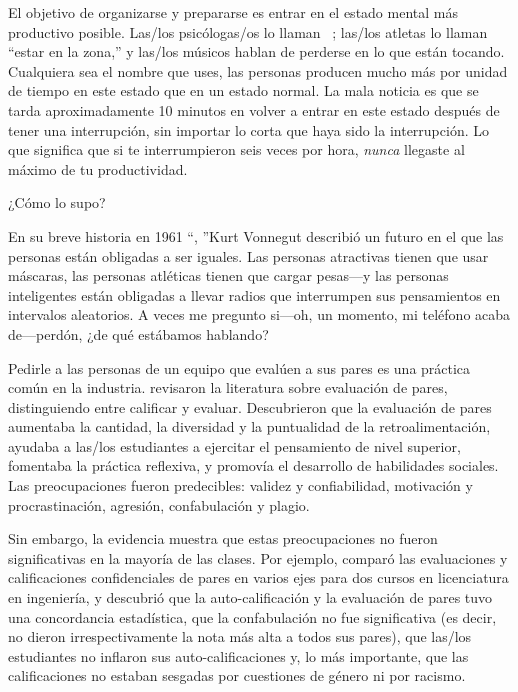 El objetivo de organizarse y prepararse es
entrar en el estado mental más productivo posible.
Las/los psicólogas/os lo llaman ~\cite{Csik2008};
las/los atletas lo llaman ``estar en la zona,''
y las/los músicos hablan de perderse en lo que están tocando.
Cualquiera sea el nombre que uses,
las personas producen mucho más por unidad de tiempo en este estado que en un estado normal.
La mala noticia es que
se tarda aproximadamente 10 minutos en volver a entrar en este estado después de tener una interrupción,
sin importar lo corta que haya sido la interrupción.
Lo que significa que si te interrumpieron seis veces por hora,
\emph{nunca} llegaste al máximo de tu productividad.

\newpage

\begin{aside}{¿Cómo lo supo?}

  En su breve historia en 1961 ``, ''Kurt Vonnegut describió un futuro en el que las personas están obligadas a ser iguales.
  Las personas atractivas tienen que usar máscaras,
  las personas atléticas tienen que cargar pesas---y las personas inteligentes
  están obligadas a llevar radios que interrumpen sus pensamientos en intervalos aleatorios.
  A veces me pregunto si---oh, un momento, mi teléfono acaba de---perdón, ¿de qué estábamos hablando?

\end{aside}


Pedirle a las personas de un equipo que evalúen a sus pares es una práctica común en la industria.
\cite{Sond2012} revisaron la literatura sobre evaluación de pares,
distinguiendo entre calificar y evaluar.
Descubrieron que la evaluación de pares aumentaba la cantidad, la diversidad y la puntualidad de la retroalimentación,
ayudaba a las/los estudiantes a ejercitar el pensamiento de nivel superior,
fomentaba la práctica reflexiva,
y promovía el desarrollo de habilidades sociales.
Las preocupaciones fueron predecibles:
validez y confiabilidad,
motivación y procrastinación,
agresión, confabulación y plagio.

Sin embargo,
la evidencia muestra que estas preocupaciones no fueron significativas en la mayoría de las clases.
Por ejemplo,
\cite{Kauf2000} comparó las evaluaciones y calificaciones confidenciales de pares en varios ejes
para dos cursos en licenciatura en ingeniería,
y descubrió que la auto-calificación y la evaluación de pares tuvo una concordancia estadística,
que la confabulación no fue significativa (es decir, no dieron irrespectivamente la nota más alta a todos sus pares),
que las/los estudiantes no inflaron sus auto-calificaciones
y, lo más importante,
que las calificaciones no estaban sesgadas por cuestiones de género ni por racismo.


